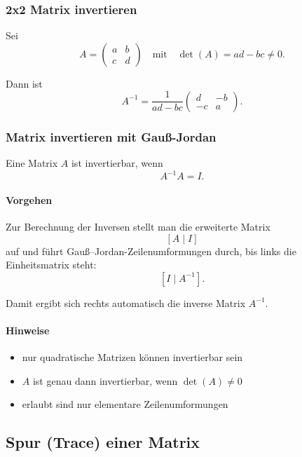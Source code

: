 \documentclass[9pt,a4paper]{article}
\begin{document}
    \subsubsection{2x2 Matrix invertieren}
    Sei
    \[
    A =
    \begin{pmatrix}
        a & b\\
        c & d
    \end{pmatrix}
    \quad\text{mit}\quad
    \det(A)=ad-bc \neq 0.
    \]
    
    Dann ist
    \[
    A^{-1}
    =
    \frac{1}{ad-bc}
    \begin{pmatrix}
        d & -b\\
        -c & a
    \end{pmatrix}.
    \]
    
    \subsubsection{Matrix invertieren mit Gauß-Jordan}
    
    Eine Matrix $A$ ist invertierbar, wenn
    \[
    A^{-1}A = I.
    \]
    
    \paragraph*{Vorgehen}
    Zur Berechnung der Inversen stellt man die erweiterte Matrix
    \[
    [A \mid I]
    \]
    auf und führt Gauß--Jordan-Zeilenumformungen durch, bis links die
    Einheitsmatrix steht:
    \[
    [I \mid A^{-1}].
    \]
    
    Damit ergibt sich rechts automatisch die inverse Matrix $A^{-1}$.
    
    \paragraph*{Hinweise}
    \begin{itemize}
        \item nur quadratische Matrizen können invertierbar sein
        \item $A$ ist genau dann invertierbar, wenn $\det(A)\neq 0$
        \item erlaubt sind nur elementare Zeilenumformungen
    \end{itemize}
    
    \subsection{Spur (Trace) einer Matrix}
    
\end{document}
